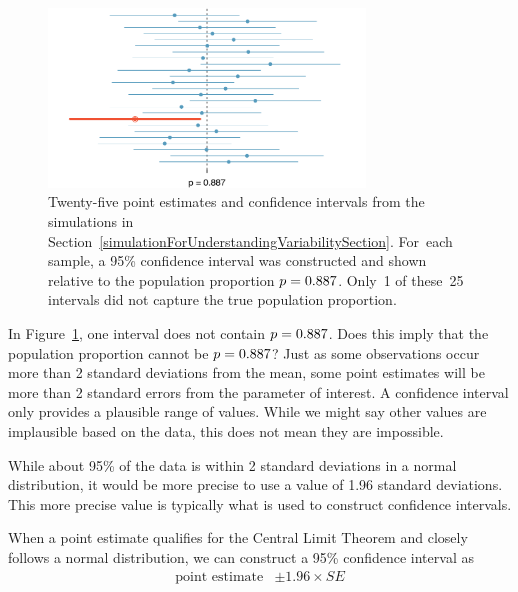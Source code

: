 \begin{figure}
   \centering
   \includegraphics[width=0.75\textwidth]{ch_inference_for_props/figures/95PercentConfidenceInterval/95PercentConfidenceInterval}
   \caption{Twenty-five point estimates and confidence
       intervals from the simulations in
       Section~\ref{simulationForUnderstandingVariabilitySection}.
       For~each sample, a 95\% confidence interval was
       constructed and shown relative to the population
       proportion $p = 0.887{}$. Only~1 of these~25
       intervals did not capture the true population
       proportion.}
   \label{95PercentConfidenceInterval}
\end{figure}

\begin{example}{In Figure~\ref{95PercentConfidenceInterval},
one interval does not contain $p = 0.887{}$.
Does this imply that the population proportion cannot be
$p = 0.887{}$?}
Just as some observations occur more than 2 standard deviations
from the mean, some point estimates will be more than
2 standard errors from the parameter of interest.
A confidence interval only provides a plausible range
of values. While we might say other values are implausible
based on the data, this does not mean they are impossible.
\end{example}

While about 95\% of the data is within 2 standard deviations
in a normal distribution, it would be more precise to use
a value of 1.96 standard deviations. This more precise value
is typically what is used to construct confidence intervals.

\begin{termBox}{
  When a point estimate qualifies for the Central Limit
  Theorem and closely follows a normal distribution,
  we can construct a 95\% confidence interval as
  \begin{align*}
  \text{point estimate} &\pm 1.96 \times SE
  \end{align*}}
\end{termBox}

